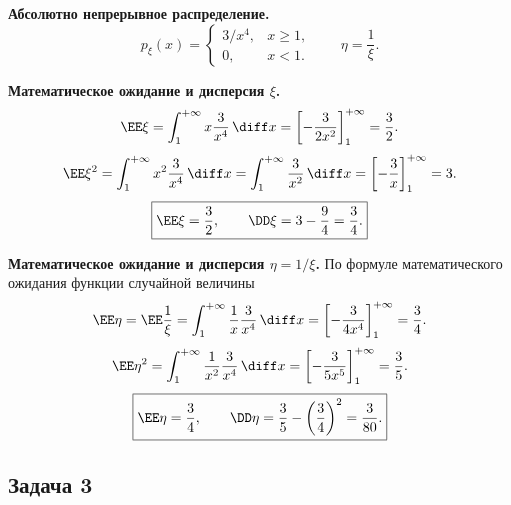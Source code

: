 \begin{solution}
    \textbf{Абсолютно непрерывное распределение.}
    \[
        p_\xi(x)=\begin{cases}
            3/x^4,&x\geq1,\\
            0,&x<1.
        \end{cases}
        \qquad \eta=\frac1\xi.
    \]
    \begin{center}
    \end{center}

    \textbf{Математическое ожидание и дисперсия $\xi$.}
    \[
        \EE\xi=\int_1^{+\infty}x\frac3{x^4}\,\diff x
        =\left[-\frac3{2x^2}\right]_1^{+\infty}=\frac32.
    \]
    \[
        \EE\xi^2=\int_1^{+\infty}x^2\frac3{x^4}\,\diff x
        =\int_1^{+\infty}\frac3{x^2}\,\diff x
        =\left[-\frac3x\right]_1^{+\infty}=3.
    \]
    \[
        \boxed{\EE\xi=\frac32,\qquad
        \DD\xi=3-\frac94=\frac34.}
    \]

    \textbf{Математическое ожидание и дисперсия $\eta=1/\xi$.}
    По формуле математического ожидания функции случайной величины
    \[
        \EE\eta=\EE\frac1\xi
        =\int_1^{+\infty}\frac1x\frac3{x^4}\,\diff x
        =\left[-\frac3{4x^4}\right]_1^{+\infty}=\frac34.
    \]
    \[
        \EE\eta^2=\int_1^{+\infty}\frac1{x^2}\frac3{x^4}\,\diff x
        =\left[-\frac3{5x^5}\right]_1^{+\infty}=\frac35.
    \]
    \[
        \boxed{\EE\eta=\frac34,\qquad
        \DD\eta=\frac35-\left(\frac34\right)^2=\frac3{80}.}
    \]
\end{solution}

\clearpage
\subsection{Задача 3}


